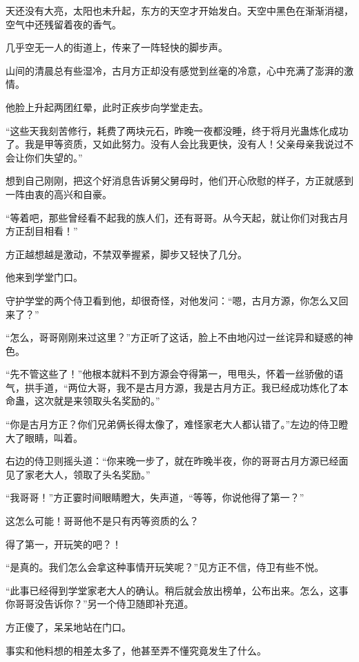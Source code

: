 
\begin{this_body}

天还没有大亮，太阳也未升起，东方的天空才开始发白。天空中黑色在渐渐消褪，空气中还残留着夜的香气。

几乎空无一人的街道上，传来了一阵轻快的脚步声。

山间的清晨总有些湿冷，古月方正却没有感觉到丝毫的冷意，心中充满了澎湃的激情。

他脸上升起两团红晕，此时正疾步向学堂走去。

“这些天我刻苦修行，耗费了两块元石，昨晚一夜都没睡，终于将月光蛊炼化成功了。我是甲等资质，又如此努力。没有人会比我更快，没有人！父亲母亲我说过不会让你们失望的。”

想到自己刚刚，把这个好消息告诉舅父舅母时，他们开心欣慰的样子，方正就感到一阵由衷的高兴和自豪。

“等着吧，那些曾经看不起我的族人们，还有哥哥。从今天起，就让你们对我古月方正刮目相看！”

方正越想越是激动，不禁双拳握紧，脚步又轻快了几分。

他来到学堂门口。

守护学堂的两个侍卫看到他，却很奇怪，对他发问：“嗯，古月方源，你怎么又回来了？”

“怎么，哥哥刚刚来过这里？”方正听了这话，脸上不由地闪过一丝诧异和疑惑的神色。

“先不管这些了！”他根本就料不到方源会夺得第一，甩甩头，怀着一丝骄傲的语气，拱手道，“两位大哥，我不是古月方源，我是古月方正。我已经成功炼化了本命蛊，这次就是来领取头名奖励的。”

“你是古月方正？你们兄弟俩长得太像了，难怪家老大人都认错了。”左边的侍卫瞪大了眼睛，叫着。

右边的侍卫则摇头道：“你来晚一步了，就在昨晚半夜，你的哥哥古月方源已经面见了家老大人，领取了头名奖励。”

“我哥哥！”方正霎时间眼睛瞪大，失声道，“等等，你说他得了第一？”

这怎么可能！哥哥他不是只有丙等资质的么？

得了第一，开玩笑的吧？！

“是真的。我们怎么会拿这种事情开玩笑呢？”见方正不信，侍卫有些不悦。

“此事已经得到学堂家老大人的确认。稍后就会放出榜单，公布出来。怎么，这事你哥哥没告诉你？”另一个侍卫随即补充道。

方正傻了，呆呆地站在门口。

事实和他料想的相差太多了，他甚至弄不懂究竟发生了什么。


\end{this_body}
